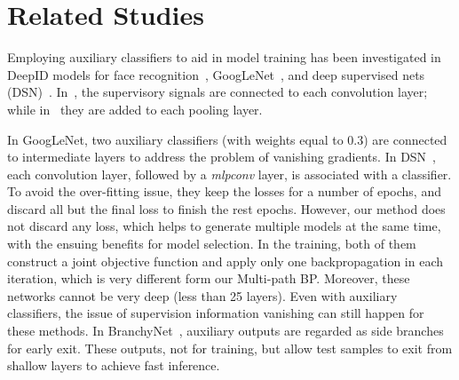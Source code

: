 \documentclass[10pt,onecolumn,letterpaper]{article}
\def\SexyName{AuxNet\xspace}
\begin{document}
\begin{itemize}
\end{itemize}




\section{Related Studies}\label{sec:related_Studies}
Employing auxiliary classifiers to aid in model training has been investigated in DeepID models for face recognition~\cite{sun2015deeply,sun2015deepid3}, GoogLeNet~\cite{szegedy2015going}, and deep supervised nets (DSN)~\cite{Lee2015,wang2015training}. In~\cite{sun2015deeply},  the supervisory signals are connected to each convolution layer; while in~\cite{sun2015deepid3} they are added to each pooling layer.

In GoogLeNet, two auxiliary classifiers (with weights equal to 0.3) are connected to intermediate layers to address the problem of vanishing gradients. In DSN~\cite{Lee2015}, each convolution layer, followed by a \emph{mlpconv} layer, is associated with a classifier. To avoid the over-fitting issue, they keep the losses for a number of epochs, and discard all but the final loss to finish the rest epochs. However, our method does not discard any loss, which helps to generate multiple models at the same time, with the ensuing benefits for model selection. In the training, both of them construct a joint objective function and apply only one backpropagation in each iteration, which is very different form our Multi-path BP. Moreover, these networks cannot be very deep (less than 25 layers). Even with auxiliary classifiers, the issue of supervision information vanishing can still happen for these methods.
In BranchyNet~\cite{teerapittayanon2016branchynet}, auxiliary outputs are regarded as side branches for early exit. These outputs, not for training, but allow test samples to exit from shallow layers to achieve fast inference.
\end{document}
